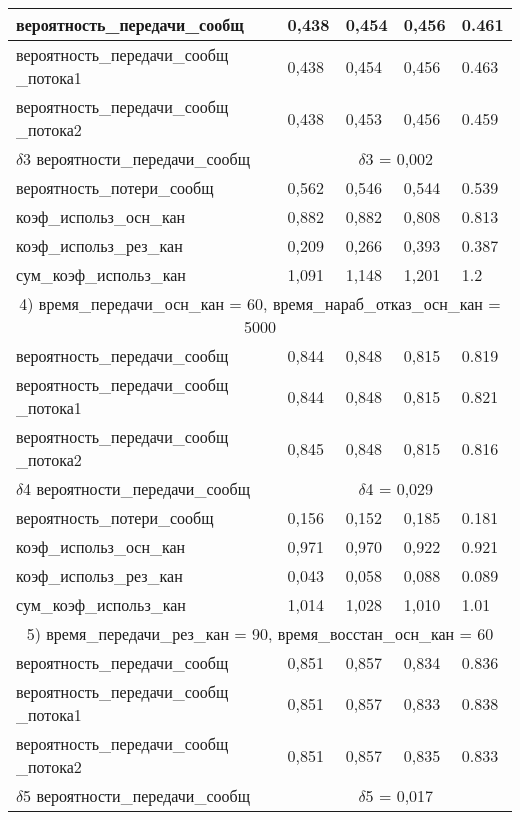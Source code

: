 \begin{longtable} {
	|p{}
	|p{}
	|p{}
	|p{}
	|p{}
	|}
	вероятность\_передачи\_сообщ & 0,438 & 0,454 & 0,456 & 0.461 \\ \hline
	вероятность\_передачи\_сообщ \_потока1 & 0,438 & 0,454
		& 0,456 & 0.463 \\ \hline
	вероятность\_передачи\_сообщ \_потока2 & 0,438 & 0,453
		& 0,456 & 0.459 \\ \hline
	$\delta$3 вероятности\_передачи\_сообщ &
		\multicolumn{4}{|c|}{$\delta$3 = 0,002} \\ \hline
	вероятность\_потери\_сообщ & 0,562 & 0,546 & 0,544 & 0.539 \\ \hline
	коэф\_использ\_осн\_кан & 0,882 & 0,882 & 0,808 & 0.813 \\ \hline
	коэф\_использ\_рез\_кан & 0,209 & 0,266 & 0,393 & 0.387 \\ \hline
	сум\_коэф\_использ\_кан & 1,091 & 1,148 & 1,201 & 1.2 \\ \hline
	\multicolumn{5}{|c|}{4) время\_передачи\_осн\_кан = 60,
		время\_нараб\_отказ\_осн\_кан = 5000} \\ \hline
	вероятность\_передачи\_сообщ & 0,844 & 0,848 & 0,815 & 0.819 \\ \hline
	вероятность\_передачи\_сообщ \_потока1 & 0,844 & 0,848
		& 0,815 & 0.821 \\ \hline
	вероятность\_передачи\_сообщ \_потока2 & 0,845 & 0,848
		& 0,815 & 0.816 \\ \hline
	$\delta$4 вероятности\_передачи\_сообщ &
		\multicolumn{4}{|c|}{$\delta$4 = 0,029} \\ \hline
	вероятность\_потери\_сообщ & 0,156 & 0,152 & 0,185 & 0.181 \\ \hline
	коэф\_использ\_осн\_кан & 0,971 & 0,970 & 0,922 & 0.921 \\ \hline
	коэф\_использ\_рез\_кан & 0,043 & 0,058 & 0,088 & 0.089 \\ \hline
	сум\_коэф\_использ\_кан & 1,014 & 1,028 & 1,010 & 1.01 \\ \hline
	\multicolumn{5}{|c|}{5) время\_передачи\_рез\_кан = 90,
		время\_восстан\_осн\_кан = 60} \\ \hline
	вероятность\_передачи\_сообщ & 0,851 & 0,857 & 0,834 & 0.836 \\ \hline
	вероятность\_передачи\_сообщ \_потока1 & 0,851 & 0,857
		& 0,833 & 0.838 \\ \hline
	вероятность\_передачи\_сообщ \_потока2 & 0,851 & 0,857
		& 0,835 & 0.833 \\ \hline
	$\delta$5 вероятности\_передачи\_сообщ &
		\multicolumn{4}{|c|}{$\delta$5 = 0,017} \\ \hline

\end{longtable}
